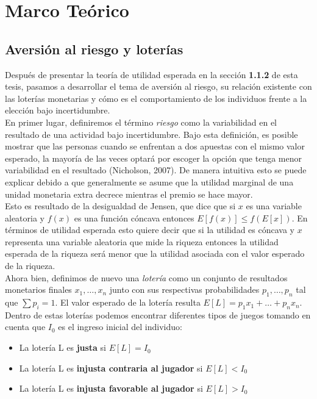 \chapter{Marco Teórico}



\section{Aversión al riesgo y loterías}

\noindent Después de presentar la teoría de utilidad esperada en la sección \textbf{1.1.2} de esta tesis, pasamos a desarrollar el tema de aversión al riesgo, su relación existente con las loterías monetarias y cómo es el comportamiento de los individuos frente a la elección bajo incertidumbre. \\

En primer lugar, definiremos el término \textit{riesgo} como la variabilidad en el resultado de una actividad bajo incertidumbre. Bajo esta definición, es posible mostrar que las personas cuando se enfrentan a dos apuestas con el mismo valor esperado, la mayoría de las veces optará por escoger la opción que tenga menor variabilidad en el resultado (Nicholson, 2007). De manera intuitiva esto se puede explicar debido a que generalmente se asume que la utilidad marginal de una unidad monetaria extra decrece mientras el premio se hace mayor. \\

Esto es resultado de la desigualdad de Jensen, que dice que si $x$ es una variable aleatoria y $f(x)$ es una función cóncava entonces $E[f(x)] \leq f(E[x])$. En términos de utilidad esperada esto quiere decir que si la utilidad es cóncava y $x$ representa una variable aleatoria que mide la riqueza entonces la utilidad esperada de la riqueza será menor que la utilidad asociada con el valor esperado de la riqueza. \\


Ahora bien, definimos de nuevo una \textit{lotería} como un conjunto de resultados monetarios finales $x_1,\dots,x_n$ junto con sus respectivas probabilidades $p_1,\dots,p_n$ tal que $\sum p_i = 1$. El valor esperado de la lotería resulta $E[L] = p_1x_1 + \dots + p_nx_n$. Dentro de estas loterías podemos encontrar diferentes tipos de juegos tomando en cuenta que $I_0$ es el ingreso inicial del individuo: 

\begin{itemize}
    \item La lotería L es \textbf{justa} si $E[L] = I_0$
    \item La lotería L es \textbf{injusta contraria al jugador} si $E[L] < I_0$
    \item La lotería L es \textbf{injusta favorable al jugador} si  $E[L] > I_0$
\end{itemize}

